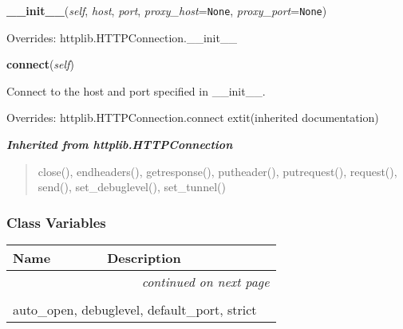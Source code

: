 \hspace{.8\funcindent}\begin{boxedminipage}{\funcwidth}

    \raggedright \textbf{\_\_init\_\_}(\textit{self}, \textit{host}, \textit{port}, \textit{proxy\_host}={\tt None}, \textit{proxy\_port}={\tt None})

\setlength{\parskip}{2ex}
\setlength{\parskip}{1ex}
      Overrides: httplib.HTTPConnection.\_\_init\_\_

    \end{boxedminipage}

    \vspace{0.5ex}

\hspace{.8\funcindent}\begin{boxedminipage}{\funcwidth}

    \raggedright \textbf{connect}(\textit{self})

\setlength{\parskip}{2ex}
    Connect to the host and port specified in \_\_init\_\_.

\setlength{\parskip}{1ex}
      Overrides: httplib.HTTPConnection.connect 	extit{(inherited documentation)}

    \end{boxedminipage}


\large{\textbf{\textit{Inherited from httplib.HTTPConnection}}}

\begin{quote}
close(), endheaders(), getresponse(), putheader(), putrequest(), request(), send(), set\_debuglevel(), set\_tunnel()
\end{quote}


  \subsubsection{Class Variables}

    \vspace{-1cm}
\hspace{\varindent}\begin{longtable}{|p{\varnamewidth}|p{\vardescrwidth}|l}
\cline{1-2}
\cline{1-2} \centering \textbf{Name} & \centering \textbf{Description}& \\
\cline{1-2}
\endhead\cline{1-2}\multicolumn{3}{r}{\small\textit{continued on next page}}\\\endfoot\cline{1-2}
\endlastfoot\multicolumn{2}{|l|}{\textit{Inherited from httplib.HTTPConnection}}\\
\multicolumn{2}{|p{\varwidth}|}{\raggedright auto\_open, debuglevel, default\_port, strict}\\
\cline{1-2}
\end{longtable}

